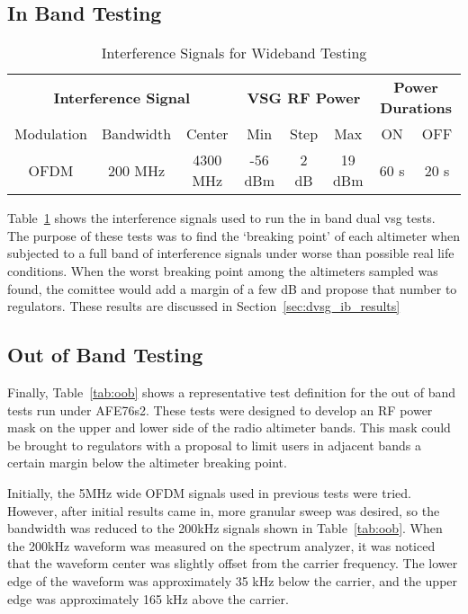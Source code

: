 \subsection{In Band Testing}\label{sub:ib}
\begin{table}[]
\begin{tabular}{c|c|c|c|c|c|c|c}
\multicolumn{3}{c|}{\textbf{Interference Signal}} & \multicolumn{3}{c|}{\textbf{VSG RF Power}} & \multicolumn{2}{c}{\textbf{Power Durations}} \\
Modulation    & Bandwidth   & Center     & Min         & Step    & Max       & ON                & OFF              \\ \hline
OFDM          & 200 MHz     & 4300 MHz   & -56 dBm     & 2 dB    & 19 dBm    & 60 s              & 20 s            
\end{tabular}
\caption{Interference Signals for Wideband Testing}
\label{tab:Wideband}
\end{table}


Table~\ref{tab:Wideband} shows the interference signals used to run the in band dual vsg tests. The purpose of these tests was to find the `breaking point' of each altimeter when subjected to a full band of interference signals under worse than possible real life conditions. When the worst breaking point among the altimeters sampled was found, the comittee would add a margin of a few dB and propose that number to regulators. These results are discussed in Section~\ref{sec:dvsg_ib_results}
\subsection{Out of Band Testing}\label{sub:oob}
Finally, Table~\ref{tab:oob} shows a representative test definition for the out of band tests run under AFE76s2. These tests were designed to develop an RF power mask on the upper and lower side of the radio altimeter bands. This mask could be brought to regulators with a proposal to limit users in adjacent bands a certain margin below the altimeter breaking point. 

Initially, the 5MHz wide OFDM signals used in previous tests were tried. However, after initial results came in, more granular sweep was desired, so the bandwidth was reduced to the 200kHz signals shown in Table~\ref{tab:oob}. When the 200kHz waveform was measured on the spectrum analyzer, it was noticed that the waveform center was slightly offset from the carrier frequency. The lower edge of the waveform was approximately 35 kHz below the carrier, and the upper edge was approximately 165 kHz above the carrier. 

